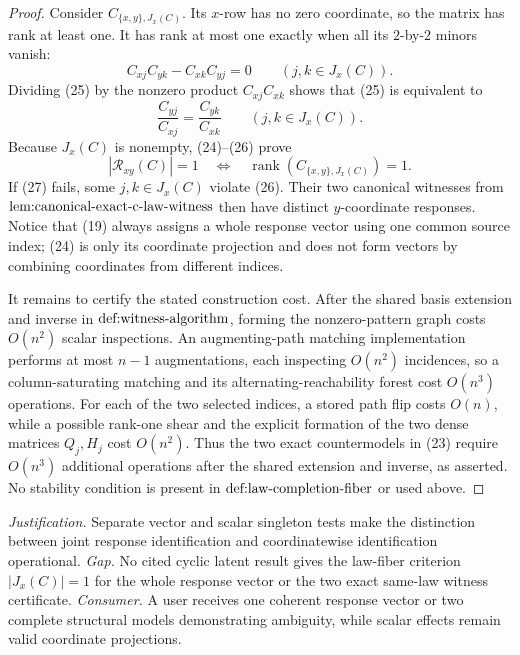 \documentclass{article}
\begin{document}
\begin{proof}
Consider \(C_{\{x,y\},J_x(C)}\).  Its \(x\)-row has no zero coordinate, so the matrix has rank at least one.  It has rank at most one exactly when all its \(2\)-by-\(2\) minors vanish:
\[
 C_{xj}C_{yk}-C_{xk}C_{yj}=0
 \qquad(j,k\in J_x(C)).                                                     \tag{25}
\]
Dividing (25) by the nonzero product \(C_{xj}C_{xk}\) shows that (25) is equivalent to
\[
 \frac{C_{yj}}{C_{xj}}=\frac{C_{yk}}{C_{xk}}
 \qquad(j,k\in J_x(C)).                                                     \tag{26}
\]
Because \(J_x(C)\) is nonempty, (24)--(26) prove
\[
 |\mathcal R_{xy}(C)|=1
 \quad\Longleftrightarrow\quad
 \operatorname{rank}\!\left(C_{\{x,y\},J_x(C)}\right)=1.                   \tag{27}
\]
If (27) fails, some \(j,k\in J_x(C)\) violate (26).  Their two canonical witnesses from
\(\textnormal{lem:canonical-exact-c-law-witness}\) then have distinct \(y\)-coordinate responses.  Notice that (19) always assigns a whole response vector using one common source index; (24) is only its coordinate projection and does not form vectors by combining coordinates from different indices.

It remains to certify the stated construction cost.  After the shared basis extension and inverse in
\(\textnormal{def:witness-algorithm}\), forming the nonzero-pattern graph costs \(O(n^2)\) scalar inspections.  An augmenting-path matching implementation performs at most \(n-1\) augmentations, each inspecting \(O(n^2)\) incidences, so a column-saturating matching and its alternating-reachability forest cost \(O(n^3)\) operations.  For each of the two selected indices, a stored path flip costs \(O(n)\), while a possible rank-one shear and the explicit formation of the two dense matrices \(Q_j,H_j\) cost \(O(n^2)\).  Thus the two exact countermodels in (23) require \(O(n^3)\) additional operations after the shared extension and inverse, as asserted.  No stability condition is present in \(\textnormal{def:law-completion-fiber}\) or used above.
\end{proof}
\par\smallskip\noindent \textit{Justification.} Separate vector and scalar singleton tests make the distinction between joint response identification and coordinatewise identification operational. \textit{Gap.} No cited cyclic latent result gives the law-fiber criterion \(|J_x(C)|=1\) for the whole response vector or the two exact same-law witness certificate. \textit{Consumer.} A user receives one coherent response vector or two complete structural models demonstrating ambiguity, while scalar effects remain valid coordinate projections.
\end{document}
